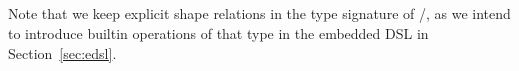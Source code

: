 \begin{code}[hide]
\AgdaSpace{}%
\<%
\\
%
\>[2]\AgdaSpace{}%
\AgdaSymbol{\{}\AgdaSpace{}%
\AgdaSymbol{=}\AgdaSpace{}%
\AgdaSymbol{\}\{}\AgdaSymbol{\}\{}\AgdaSymbol{\}\{}\AgdaSymbol{\}}\AgdaSpace{}%
\AgdaSpace{}%
\AgdaSpace{}%
\AgdaSpace{}%
\AgdaSpace{}%
\AgdaSpace{}%
\<%
\\
\>[2][@{}l@{\AgdaIndent{0}}]%
\>[6]\AgdaSpace{}%
\AgdaSymbol{((}\AgdaSpace{}%
\AgdaSpace{}%
\AgdaSymbol{)}\AgdaSpace{}%
\AgdaSpace{}%
\AgdaSpace{}%
\AgdaSpace{}%
\AgdaSymbol{)}\AgdaSpace{}%
\AgdaSpace{}%
\<%
\\
%
\>[2]\AgdaSpace{}%
\AgdaSymbol{|}\AgdaSpace{}%
\AgdaSpace{}%
\AgdaSymbol{(}\AgdaSpace{}%
\AgdaOperator{\AgdaInductiveConstructor{,}}\AgdaSpace{}%
\AgdaSymbol{)}\AgdaSpace{}%
\AgdaSpace{}%
\AgdaSpace{}%
\AgdaSpace{}%
\AgdaSpace{}%
\AgdaSpace{}%
\AgdaSymbol{\AgdaUnderscore{}}\AgdaSpace{}%
\AgdaSymbol{\AgdaUnderscore{}}\AgdaSpace{}%
\AgdaSpace{}%
\AgdaSymbol{=}\AgdaSpace{}%
\<%
\\
%
\>[2]\AgdaSpace{}%
\AgdaSymbol{|}\AgdaSpace{}%
\AgdaSpace{}%
\AgdaSpace{}%
\AgdaSymbol{=}\AgdaSpace{}%
\AgdaSpace{}%
\AgdaSymbol{(}\AgdaSpace{}%
\AgdaSymbol{(}\AgdaSpace{}%
\AgdaOperator{\AgdaInductiveConstructor{,}}\AgdaSpace{}%
\AgdaSymbol{))}\<%
\end{code}
Note that we keep explicit shape relations in the type signature of
/, as we intend to introduce builtin operations
of that type in the embedded DSL in Section~\ref{sec:edsl}.

